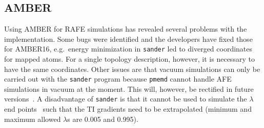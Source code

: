 \documentclass[journal=jctcce,manuscript=article]{achemso}
\newcommand{\progname}[1]{\texttt{#1}}
\begin{document}


\subsection{AMBER}
\label{sec:amber-results}

Using AMBER for RAFE simulations has revealed several problems with
the implementation.  Some bugs were identified and the developers have fixed those for AMBER16, e.g.\ energy minimization in \progname{sander} led to 
diverged coordinates for mapped atoms.  For a single topology description, 
however, it is necessary to have the same coordinates.  Other issues are that 
vacuum simulations can only be carried out with the \progname{sander} program 
because \progname{pmemd} cannot handle AFE simulations in vacuum at the 
moment.  This will, however, be rectified in future 
versions~\cite{doi:10.1021/acs.jctc.7b00102}.  A disadvantage of 
\progname{sander} is that it cannot be used to simulate the $\lambda$ end 
points~\cite{doi:10.1021/ct400340s} such that the TI gradients need to be 
extrapolated (minimum and maximum allowed $\lambda$s are 0.005 and 0.995). 
\end{document}
